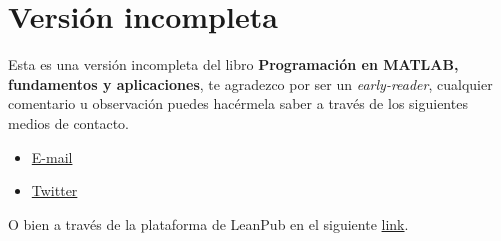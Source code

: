 \chapter*{Versión incompleta}

Esta es una versión incompleta del libro \textbf{Programación en MATLAB,
fundamentos y aplicaciones}, te agradezco por ser un
\emph{early-reader}, cualquier comentario u observación puedes hacérmela
saber a través de los siguientes medios de contacto.

\begin{itemize}
\tightlist
\item
  \href{delossantosmfq@gmail.com}{E-mail}
\item
  \href{https://twitter.com/pjdlsl}{Twitter}
\end{itemize}

O bien a través de la plataforma de LeanPub en el siguiente
\href{https://leanpub.com/programacionmatlab/email_author/new}{link}.